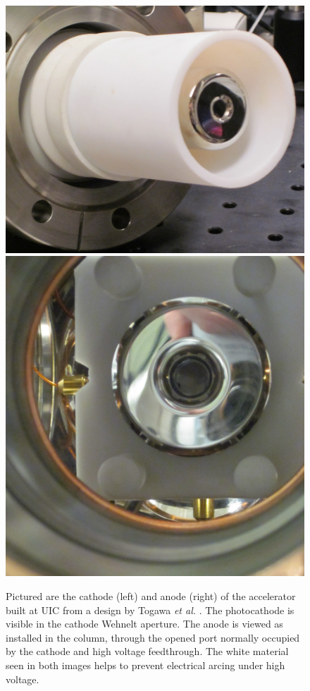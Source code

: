 \begin{figure}
  \centering
  \centerline{\includegraphics{cathode.jpg} \includegraphics{anode.jpg}}
  \caption[Pictures of the employed Togawa-inspired custom cathode-anode pair]{
    Pictured are the cathode (left) and anode (right) of the accelerator built at UIC from a design by Togawa \protect\textit{et al.} \protect\cite{togawa_ceb6_2007}.
    The photocathode is visible in the cathode Wehnelt aperture.
    The anode is viewed as installed in the column, through the opened port normally occupied by the cathode and high voltage feedthrough.
    The white material seen in both images helps to prevent electrical arcing under high voltage.
  }
  \label{fig:togawa-pic}
\end{figure}

